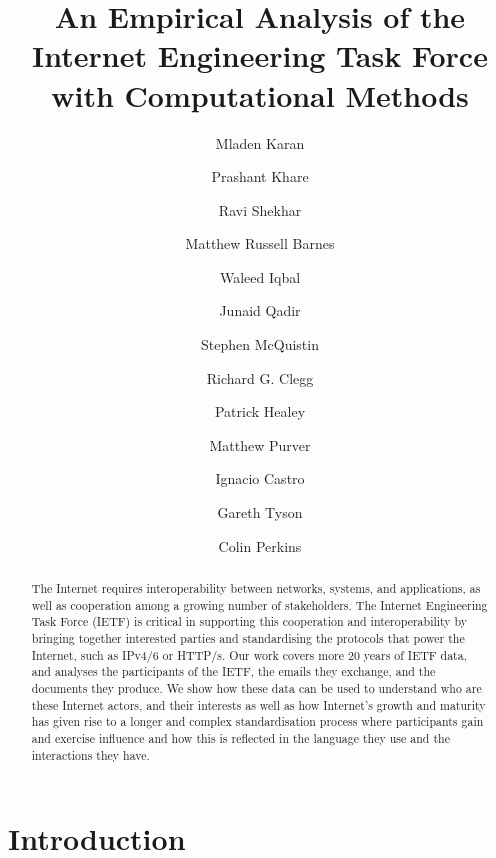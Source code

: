 \documentclass[twocolumn,10pt]{article}
\begin{document}
\title{An Empirical Analysis of the Internet Engineering Task Force 
       with Computational Methods}
\author{Mladen Karan \and
        Prashant Khare \and
        Ravi Shekhar \and
        Matthew Russell Barnes \and
        Waleed Iqbal \and
        Junaid Qadir \and
        Stephen McQuistin \and
        Richard G. Clegg \and
        Patrick Healey \and
        Matthew Purver \and
        Ignacio Castro \and
        Gareth Tyson \and
        Colin Perkins}

\maketitle
\begin{abstract}

  The Internet requires interoperability between networks, systems, and
  applications, as well as cooperation among a growing number of
  stakeholders. The Internet Engineering Task Force (IETF) is critical in
  supporting this cooperation and interoperability by bringing together
  interested parties and standardising the protocols that power the
  Internet, such as IPv4/6 or HTTP/s. Our work covers more 20 years of IETF
  data, and analyses the participants of the IETF, the emails they
  exchange, and the documents they produce. We show how these data can be
  used to understand who are these Internet actors, and their interests as
  well as how Internet's growth and maturity has given rise to a longer and
  complex standardisation process where participants gain and exercise
  influence and how this is reflected in the language they use and the
  interactions they have.
  

\end{abstract}
\section{Introduction}

%
\end{document}
